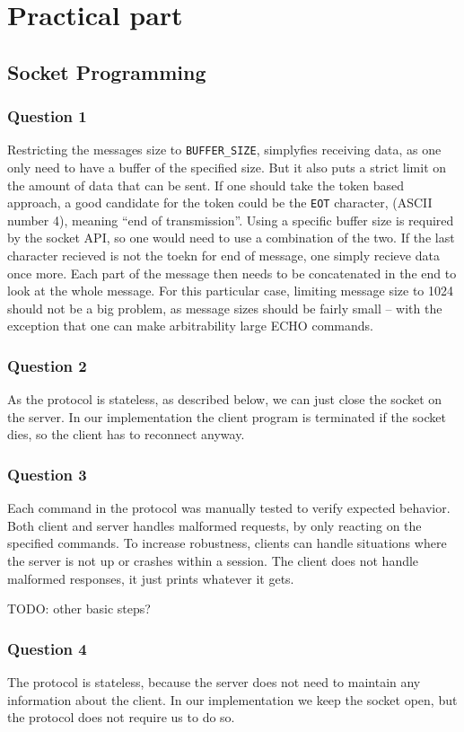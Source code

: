 
\section{Practical part}
\subsection{Socket Programming}

\subsubsection{Question 1}

Restricting the messages size to \texttt{BUFFER\_SIZE}, simplyfies receiving data, as one only need to have a buffer of the specified size. But it also puts a strict limit on the amount of data that can be sent.
If one should take the token based approach, a good candidate for the token could be the \texttt{EOT} character, (ASCII number 4), meaning ``end of transmission''.
Using a specific buffer size is required by the socket API, so one would need to use a combination of the two. If the last character recieved is not the toekn for end of message, one simply recieve data once more. Each part of the message then needs to be concatenated in the end to look at the whole message.
For this particular case, limiting message size to 1024 should not be a big problem, as message sizes should be fairly small -- with the exception that one can make arbitrability large ECHO commands.

\subsubsection{Question 2}

As the protocol is stateless, as described below, we can just close the socket on the server. In our implementation the client program is terminated if the socket dies, so the client has to reconnect anyway.

\subsubsection{Question 3}

Each command in the protocol was manually tested to verify expected behavior. Both client and server handles malformed requests, by only reacting on the specified commands. To increase robustness, clients can handle situations where the server is not up or crashes within a session. The client does not handle malformed responses, it just prints whatever it gets.

TODO: other basic steps?

\subsubsection{Question 4}

The protocol is stateless, because the server does not need to maintain any information about the client. In our implementation we keep the socket open, but the protocol does not require us to do so.
